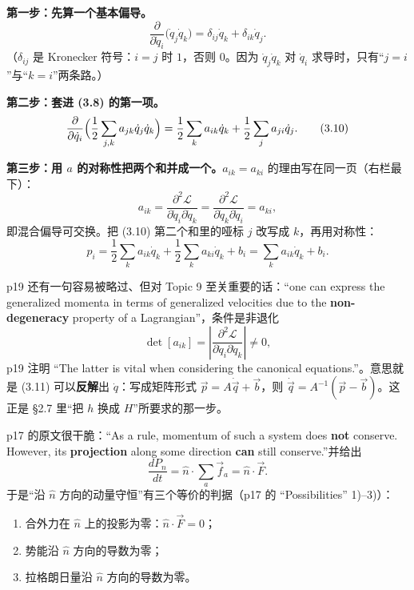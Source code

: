 \documentclass[11pt]{ctexart}
\begin{document}
\textbf{第一步：先算一个基本偏导。}
\[
\frac{\partial}{\partial\dot q_i}\bigl(\dot q_j\dot q_k\bigr)=\delta_{ij}\dot q_k+\delta_{ik}\dot q_j . \tag{3.9}
\]
（$\delta_{ij}$ 是 Kronecker 符号：$i=j$ 时 $1$，否则 $0$。因为 $\dot q_j\dot q_k$ 对 $\dot q_i$ 求导时，只有“$j=i$”与“$k=i$”两条路。）

\textbf{第二步：套进 (3.8) 的第一项。}
\[
\frac{\partial}{\partial\dot q_i}\Bigl(\frac12\sum_{j,k}a_{jk}\dot q_j\dot q_k\Bigr)
=\frac12\sum_k a_{ik}\dot q_k+\frac12\sum_j a_{ji}\dot q_j . \tag{3.10}
\]

\textbf{第三步：用 $a$ 的对称性把两个和并成一个。}$a_{ik}=a_{ki}$ 的理由写在同一页（右栏最下）：
\[
a_{ik}=\frac{\partial^2\mathcal{L}}{\partial\dot q_i\partial\dot q_k}=\frac{\partial^2\mathcal{L}}{\partial\dot q_k\partial\dot q_i}=a_{ki},
\]
即混合偏导可交换。把 (3.10) 第二个和里的哑标 $j$ 改写成 $k$，再用对称性：
\[
p_i=\frac12\sum_k a_{ik}\dot q_k+\frac12\sum_k a_{ki}\dot q_k+b_i=\sum_k a_{ik}\dot q_k+b_i . \tag{3.11}
\]


p19 还有一句容易被略过、但对 Topic 9 至关重要的话：“one can express the generalized momenta in terms of generalized velocities due to the \textbf{non-degeneracy} property of a Lagrangian”，条件是非退化
\[
\det[a_{ik}]=\left|\frac{\partial^2\mathcal{L}}{\partial\dot q_i\partial\dot q_k}\right|\ne0 ,
\]
p19 注明 “The latter is vital when considering the canonical equations.”。意思就是 (3.11) 可以\textbf{反解}出 $\dot q$：写成矩阵形式 $\vec p=A\dot{\vec q}+\vec b$，则 $\dot{\vec q}=A^{-1}(\vec p-\vec b)$。这正是 §2.7 里“把 $h$ 换成 $H$”所要求的那一步。


p17 的原文很干脆：“As a rule, momentum of such a system does \textbf{not} conserve. However, its \textbf{projection} along some direction \textbf{can} still conserve.”并给出
\[
\frac{dP_n}{dt}=\hat n\cdot\sum_a\vec f_a=\hat n\cdot\vec F . \tag{3.12}
\]
于是“沿 $\hat n$ 方向的动量守恒”有三个等价的判据（p17 的 “Possibilities” 1)--3)）：
\begin{enumerate}
\item 合外力在 $\hat n$ 上的投影为零：$\hat n\cdot\vec F=0$；
\item 势能沿 $\hat n$ 方向的导数为零；
\item 拉格朗日量沿 $\hat n$ 方向的导数为零。
\end{enumerate}
\end{document}
